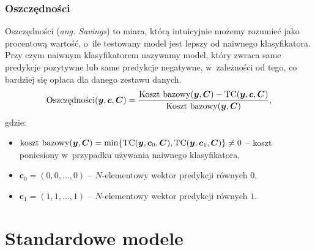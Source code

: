 \documentclass[inzynierska]{pwr_wmat_praca_dyplomowa}
\theoremstyle{plain}
\numberwithin{theorem}{chapter}
\theoremstyle{definition}
\numberwithin{theorem}{chapter}
\begin{document}
\subsubsection{Oszczędności}
Oszczędności (\textit{ang. Savings}) to miara, którą intuicyjnie możemy rozumieć jako procentową wartość, o~ile testowany model jest lepszy od naiwnego klasyfikatora. Przy czym naiwnym klasyfikatorem nazywamy model, który zwraca same predykcje pozytywne lub same predykcje negatywne, w~zależności od tego, co bardziej się opłaca dla danego zestawu danych.
\begin{equation}
	\label{oszczednosci}
	\text{Oszczędności}(\boldsymbol{y}, \boldsymbol{c}, \boldsymbol{C}) = \frac{\text{Koszt bazowy}(\boldsymbol{y}, \boldsymbol{C}) - \text{TC}(\boldsymbol{y}, \boldsymbol{c}, \boldsymbol{C})}{\text{Koszt bazowy}(\boldsymbol{y}, \boldsymbol{C})} \text{,}
\end{equation}
gdzie:
\begin{itemize}
	\item $ \text{koszt bazowy}(\boldsymbol{y}, \boldsymbol{C}) = \min\{\text{TC}(\boldsymbol{y}, \boldsymbol{c}_0, \boldsymbol{C}), \text{TC}(\boldsymbol{y}, \boldsymbol{c}_1, \boldsymbol{C})\} \neq 0$ -- koszt poniesiony w~przypadku używania naiwnego klasyfikatora,
	\item $\boldsymbol{c}_0 = (0, 0, \dots, 0)$ -- $N$-elementowy wektor predykcji równych $0$,
	\item $\boldsymbol{c}_1 = (1, 1, \dots, 1)$ -- $N$-elementowy wektor predykcji równych $1$.
\end{itemize}{}

\section{Standardowe modele}
\end{document}
